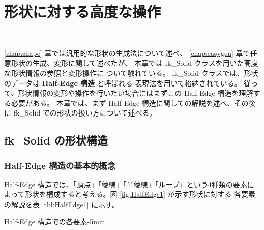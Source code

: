 \chapter{形状に対する高度な操作} \label{chap:solid} ~

\ref{chap:shape} 章では汎用的な形状の生成法について述べ、
\ref{chap:easygen} 章で任意形状の生成、変形に関して述べたが、
本章では fk\_Solid クラスを用いた高度な形状情報の参照と変形操作に
ついて触れている。
fk\_Solid クラスでは、形状のデータは \textbf{Half-Edge 構造} と呼ばれる
表現法を用いて格納されている。
従って、形状情報の変形や操作を行いたい場合にはまずこの
Half-Edge 構造を理解する必要がある。
本章では、まず Half-Edge 構造に関しての解説を述べ、その後に
fk\_Solid での形状の扱い方について述べる。
\section{fk\_Solid の形状構造}
\subsection{Half-Edge 構造の基本的概念}
Half-Edge 構造では、「頂点」「稜線」「半稜線」「ループ」という4種類の要素に
よって形状を構成すると考える。図 \ref{fig:HalfEdge1} が示す形状に対する
各要素の解説を表 \ref{tbl:HalfEdge1} に示す。

	{Half-Edge 構造での各要素}{-5mm}

